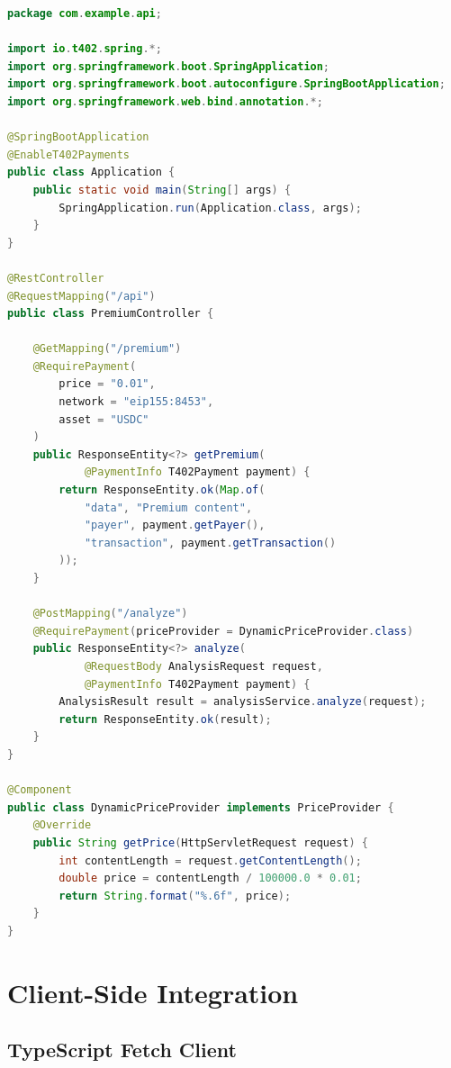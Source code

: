 \begin{lstlisting}[language=java,caption={Complete Spring Boot setup}]
package com.example.api;

import io.t402.spring.*;
import org.springframework.boot.SpringApplication;
import org.springframework.boot.autoconfigure.SpringBootApplication;
import org.springframework.web.bind.annotation.*;

@SpringBootApplication
@EnableT402Payments
public class Application {
    public static void main(String[] args) {
        SpringApplication.run(Application.class, args);
    }
}

@RestController
@RequestMapping("/api")
public class PremiumController {

    @GetMapping("/premium")
    @RequirePayment(
        price = "0.01",
        network = "eip155:8453",
        asset = "USDC"
    )
    public ResponseEntity<?> getPremium(
            @PaymentInfo T402Payment payment) {
        return ResponseEntity.ok(Map.of(
            "data", "Premium content",
            "payer", payment.getPayer(),
            "transaction", payment.getTransaction()
        ));
    }

    @PostMapping("/analyze")
    @RequirePayment(priceProvider = DynamicPriceProvider.class)
    public ResponseEntity<?> analyze(
            @RequestBody AnalysisRequest request,
            @PaymentInfo T402Payment payment) {
        AnalysisResult result = analysisService.analyze(request);
        return ResponseEntity.ok(result);
    }
}

@Component
public class DynamicPriceProvider implements PriceProvider {
    @Override
    public String getPrice(HttpServletRequest request) {
        int contentLength = request.getContentLength();
        double price = contentLength / 100000.0 * 0.01;
        return String.format("%.6f", price);
    }
}
\end{lstlisting}

\section{Client-Side Integration}
\label{sec:client-integration}

\subsection{TypeScript Fetch Client}

